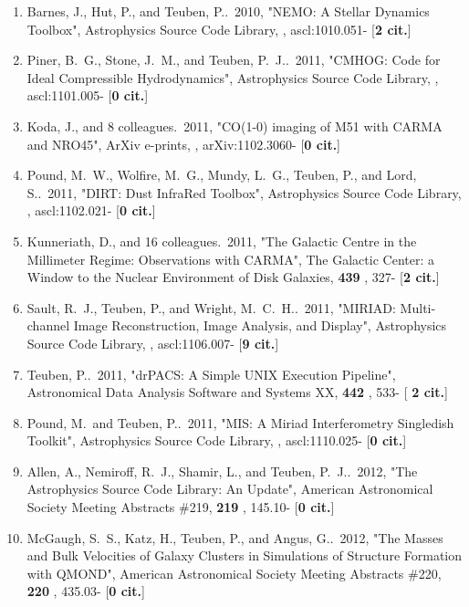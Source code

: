 \documentclass[11pt,letterpaper]{article}
\begin{document}
\begin{enumerate}[resume,label=\textbf{\arabic*}.]
\item  
Barnes, J., Hut, P., and Teuben, P..\  2010,  "NEMO: A Stellar Dynamics 
Toolbox", Astrophysics Source Code Library,  , ascl:1010.051- [{\bf 2 
cit.}] 

\item  
Piner, B.~G., Stone, J.~M., and Teuben, P.~J..\  2011,  "CMHOG: Code for 
Ideal Compressible Hydrodynamics", Astrophysics Source Code Library,  , 
ascl:1101.005- [{\bf 0 cit.}] 

\item  
Koda, J., and 8 colleagues.\  2011,  "CO(1-0) imaging of M51 with CARMA and 
NRO45", ArXiv e-prints,  , arXiv:1102.3060- [{\bf 0 cit.}] 

\item  
Pound, M.~W., Wolfire, M.~G., Mundy, L.~G., Teuben, P., and Lord, S..\  
2011,  "DIRT: Dust InfraRed Toolbox", Astrophysics Source Code Library,  , 
ascl:1102.021- [{\bf 0 cit.}] 

\item  
Kunneriath, D., and 16 colleagues.\  2011,  "The Galactic Centre in the 
Millimeter Regime: Observations with CARMA", The Galactic Center: a Window 
to the Nuclear Environment of Disk Galaxies,  {\bf 439} , 327- [{\bf 2 
cit.}] 

\item  
Sault, R.~J., Teuben, P., and Wright, M.~C.~H..\  2011,  "MIRIAD: 
Multi-channel Image Reconstruction, Image Analysis, and Display", 
Astrophysics Source Code Library,  , ascl:1106.007- [{\bf 9 cit.}] 

\item  
Teuben, P..\  2011,  "drPACS: A Simple UNIX Execution Pipeline", 
Astronomical Data Analysis Software and Systems XX,  {\bf 442} , 533- [{\bf 
2 cit.}] 

\item  
Pound, M.~and Teuben, P..\  2011,  "MIS: A Miriad Interferometry Singledish 
Toolkit", Astrophysics Source Code Library,  , ascl:1110.025- [{\bf 0 
cit.}] 

\item  
Allen, A., Nemiroff, R.~J., Shamir, L., and Teuben, P.~J..\  2012,  "The 
Astrophysics Source Code Library: An Update", American Astronomical Society 
Meeting Abstracts \#219,  {\bf 219} , 145.10- [{\bf 0 cit.}] 

\item  
McGaugh, S.~S., Katz, H., Teuben, P., and Angus, G..\  2012,  "The Masses 
and Bulk Velocities of Galaxy Clusters in Simulations of Structure 
Formation with QMOND", American Astronomical Society Meeting Abstracts 
\#220,  {\bf 220} , 435.03- [{\bf 0 cit.}] 


\end{enumerate}
\end{document}
